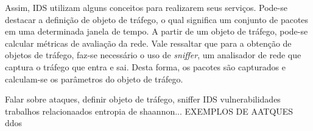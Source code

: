 Assim, IDS utilizam alguns conceitos para realizarem seus serviços. Pode-se destacar a definição de objeto de tráfego, o qual significa um conjunto de pacotes em uma determinada janela de tempo. A partir de um objeto de tráfego, pode-se calcular métricas de avaliação da rede. Vale ressaltar que para a obtenção de objetos de tráfego, faz-se necessário o uso de \textit{sniffer}, um analisador de rede que captura o tráfego que entra e sai. Desta forma, os pacotes são capturados e calculam-se os parâmetros do objeto de tráfego.

 


Falar sobre ataques, definir objeto de tráfego, sniffer IDS vulnerabilidades trabalhos relacionaados entropia de shaannon... EXEMPLOS DE AATQUES ddos
   

